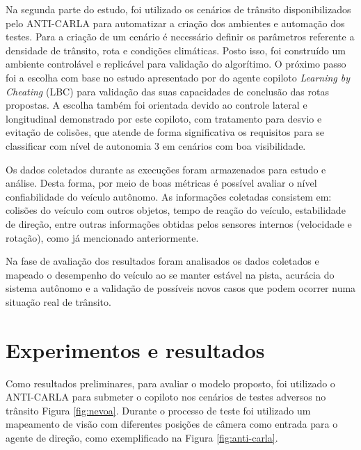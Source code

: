 \documentclass[a4paper,12pt,Times]{article}
\begin{document}
Na segunda parte do estudo, foi utilizado os cenários de trânsito disponibilizados pelo ANTI-CARLA para automatizar a criação dos ambientes e automação dos testes. Para a criação de um cenário é necessário definir os parâmetros referente a densidade de trânsito, rota e condições climáticas. Posto isso, foi construído um ambiente controlável e replicável para validação do algorítimo. O próximo passo foi a escolha com base no estudo apresentado por  do agente copiloto \textit{Learning by Cheating} (LBC) para validação das suas capacidades de conclusão das rotas propostas. A escolha também foi orientada devido ao controle lateral e longitudinal demonstrado por este copiloto, com tratamento para desvio e evitação de colisões, que atende de forma significativa os requisitos para se classificar com nível de autonomia 3 em cenários com boa visibilidade.


Os dados coletados durante as execuções foram armazenados para estudo e análise. Desta forma, por meio de boas métricas é possível avaliar o nível confiabilidade do veículo autônomo. As informações coletadas consistem em: colisões do veículo com outros objetos, tempo de reação do veículo, estabilidade de direção, entre outras informações obtidas pelos sensores internos (velocidade e rotação), como já mencionado anteriormente.


Na fase de avaliação dos resultados foram analisados os dados coletados e mapeado o  desempenho do veículo ao se manter estável na pista, acurácia do sistema autônomo e a validação de possíveis novos casos que podem ocorrer numa situação real de trânsito.

\section{Experimentos e resultados}
Como resultados preliminares, para avaliar o modelo proposto, foi utilizado o ANTI-CARLA para submeter o copiloto nos cenários de testes adversos no trânsito Figura \ref{fig:nevoa}. Durante o processo de teste foi utilizado um mapeamento de visão com diferentes posições de câmera como entrada para o agente de direção, como exemplificado na Figura \ref{fig:anti-carla}.
\end{document}

